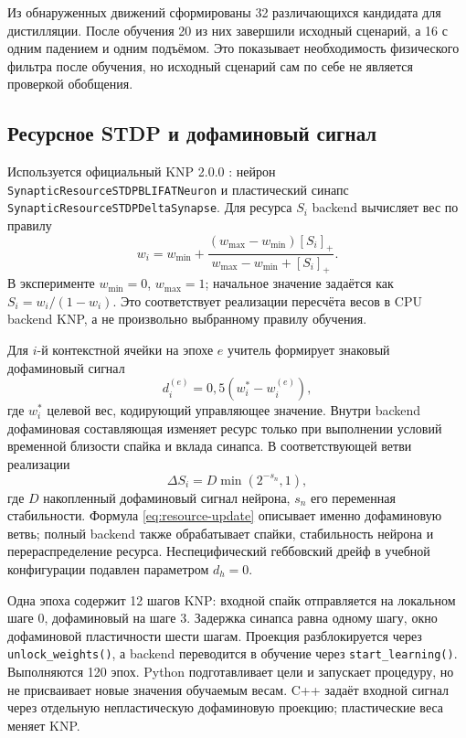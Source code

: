 \documentclass[11pt,a4paper]{article}
\newcommand{\code}[1]{\texttt{#1}}
\begin{document}
Из обнаруженных движений сформированы 32 различающихся кандидата для дистилляции. После обучения 20 из них завершили исходный сценарий, а 16 \textemdash{} с одним падением и одним подъёмом. Это показывает необходимость физического фильтра после обучения, но исходный сценарий сам по себе не является проверкой обобщения.

\subsection{Ресурсное STDP и дофаминовый сигнал}
Используется официальный KNP 2.0.0 \cite{knp}: нейрон
\code{SynapticResourceSTDPBLIFATNeuron} и пластический синапс
\code{SynapticResourceSTDPDeltaSynapse}. Для ресурса $S_i$ backend вычисляет вес по правилу
\begin{equation}
 w_i=w_{\min}+
 \frac{(w_{\max}-w_{\min})[S_i]_+}
 {w_{\max}-w_{\min}+[S_i]_+}.
 \label{eq:resource}
\end{equation}
В эксперименте $w_{\min}=0$, $w_{\max}=1$; начальное значение задаётся как $S_i=w_i/(1-w_i)$. Это соответствует реализации пересчёта весов в CPU backend KNP, а не произвольно выбранному правилу обучения.

Для $i$-й контекстной ячейки на эпохе $e$ учитель формирует знаковый дофаминовый сигнал
\begin{equation}
 d_i^{(e)}=0{,}5\left(w_i^*-w_i^{(e)}\right),
 \label{eq:dopamine}
\end{equation}
где $w_i^*$ \textemdash{} целевой вес, кодирующий управляющее значение. Внутри backend дофаминовая составляющая изменяет ресурс только при выполнении условий временной близости спайка и вклада синапса. В соответствующей ветви реализации
\begin{equation}
 \Delta S_i=D\min(2^{-s_n},1),
 \label{eq:resource-update}
\end{equation}
где $D$ \textemdash{} накопленный дофаминовый сигнал нейрона, $s_n$ \textemdash{} его переменная стабильности. Формула \eqref{eq:resource-update} описывает именно дофаминовую ветвь; полный backend также обрабатывает спайки, стабильность нейрона и перераспределение ресурса. Неспецифический геббовский дрейф в учебной конфигурации подавлен параметром $d_h=0$.

Одна эпоха содержит 12 шагов KNP: входной спайк отправляется на локальном шаге 0, дофаминовый \textemdash{} на шаге 3. Задержка синапса равна одному шагу, окно дофаминовой пластичности \textemdash{} шести шагам. Проекция разблокируется через \code{unlock\_weights()}, а backend переводится в обучение через \code{start\_learning()}. Выполняются 120 эпох. Python подготавливает цели и запускает процедуру, но не присваивает новые значения обучаемым весам. C++ задаёт входной сигнал через отдельную непластическую дофаминовую проекцию; пластические веса меняет KNP.
\end{document}
